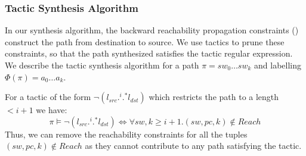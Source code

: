 \subsubsection{Tactic Synthesis Algorithm}
In our synthesis algorithm, the backward reachability propagation constraints () 
construct the path from destination to source. We use tactics to prune these constraints, so that
the path synthesized satisfies the tactic regular expression.  
We describe the tactic synthesis algorithm
for a path $\pi = sw_0 \ldots sw_k$ and labelling $\Phi(\pi) = a_0 \ldots a_k$. 

For a tactic of the form $\neg (l_{src} .^i .^* l_{dst})$ which restricts the path to a length $ < i + 1$ we have: 
\begin{equation}
	\pi \vDash \neg (l_{src} .^i .^* l_{dst}) \Leftrightarrow \forall sw,k \geq i + 1. (sw,pc,k) \notin Reach
\end{equation}
Thus, we can remove the reachability constraints for 
all the tuples $(sw,pc,k) \notin Reach$
as they cannot contribute to any path satisfying the tactic.  

